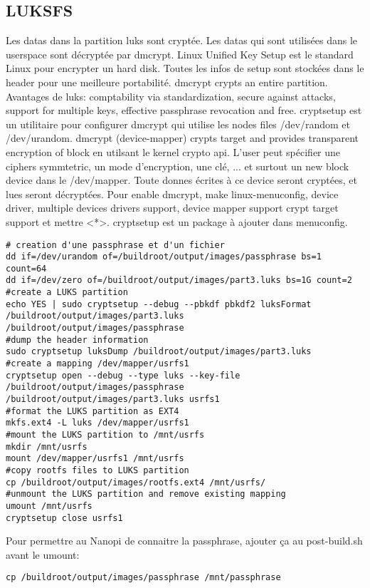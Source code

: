 \subsection{LUKSFS}
Les datas dans la partition luks sont cryptée. Les datas qui sont utilisées dans le userspace sont décryptée par dmcrypt. Linux Unified Key Setup est le standard Linux pour encrypter un hard disk. Toutes les infos de setup sont stockées dans le header pour une meilleure portabilité. dmcrypt crypts an entire partition. Avantages de luks: comptability via standardization, secure against attacks, support for multiple keys, effective passphrase revocation and free. cryptsetup est un utilitaire pour configurer dmcrypt qui utilise les nodes files /dev/random et /dev/urandom. dmcrypt (device-mapper) crypts target and provides transparent encryption of block en utilsant le kernel crypto api. L'user peut spécifier une ciphers symmtetric, un mode d'encryption, une clé, ... et surtout un new block device dans le /dev/mapper. Toute donnes écrites à ce device seront cryptées, et lues seront décryptées. Pour enable dmcrypt, make linux-menuconfig, device driver, multiple devices drivers support, device mapper support crypt target support et mettre <*>. cryptsetup est un package à ajouter dans menuconfig.
\begin{lstlisting}[style=bash]
# creation d'une passphrase et d'un fichier
dd if=/dev/urandom of=/buildroot/output/images/passphrase bs=1 count=64
dd if=/dev/zero of=/buildroot/output/images/part3.luks bs=1G count=2
#create a LUKS partition
echo YES | sudo cryptsetup --debug --pbkdf pbkdf2 luksFormat
/buildroot/output/images/part3.luks /buildroot/output/images/passphrase
#dump the header information
sudo cryptsetup luksDump /buildroot/output/images/part3.luks
#create a mapping /dev/mapper/usrfs1
cryptsetup open --debug --type luks --key-file
/buildroot/output/images/passphrase /buildroot/output/images/part3.luks usrfs1
#format the LUKS partition as EXT4
mkfs.ext4 -L luks /dev/mapper/usrfs1
#mount the LUKS partition to /mnt/usrfs
mkdir /mnt/usrfs
mount /dev/mapper/usrfs1 /mnt/usrfs
#copy rootfs files to LUKS partition
cp /buildroot/output/images/rootfs.ext4 /mnt/usrfs/
#unmount the LUKS partition and remove existing mapping
umount /mnt/usrfs
cryptsetup close usrfs1
\end{lstlisting}
Pour permettre au Nanopi de connaitre la passphrase, ajouter ça au post-build.sh avant le umount: 
\begin{lstlisting}[style=bash]
cp /buildroot/output/images/passphrase /mnt/passphrase
\end{lstlisting}

